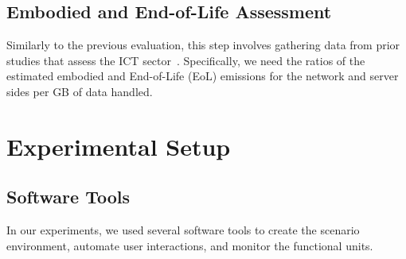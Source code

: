 \documentclass[sigconf,9pt,usenames,dvipsnames,table]{acmart}
\begin{document}
\subsection{Embodied and End-of-Life Assessment}

Similarly to the previous evaluation, this step involves gathering data
from prior studies that assess the ICT sector~\cite{malmodin2024ict}.
Specifically, we need the ratios of the estimated embodied and End-of-Life
(EoL) emissions for the network and server sides per GB of data handled.



\section{Experimental Setup}

\subsection{Software Tools}

In our experiments, we used several software tools to create the scenario environment, automate user interactions, and monitor the functional units.
\end{document}
